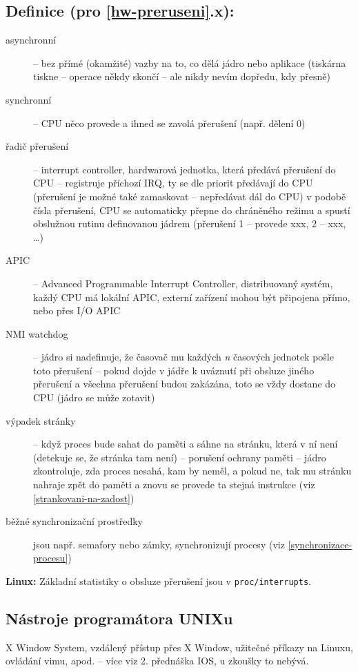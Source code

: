 \documentclass[a4paper, 11pt]{article}
\begin{document}
\subsection*{Definice (pro \ref{hw-preruseni}.x):}
\begin{description}
\item[asynchronní] -- bez přímé (okamžité) vazby na to, co dělá jádro nebo aplikace (tiskárna tiskne -- operace někdy skončí -- ale nikdy nevím dopředu, kdy přesně)

\item[synchronní] -- CPU něco provede a ihned se zavolá přerušení (např. dělení 0)

\item[řadič přerušení] -- interrupt controller, hardwarová jednotka, která předává přerušení do CPU -- registruje příchozí IRQ, ty se dle priorit předávají do CPU (přerušení je možné také zamaskovat -- nepředávat dál do CPU) v podobě čísla přerušení, CPU se automaticky přepne do chráněného režimu a spustí obslužnou rutinu definovanou jádrem (přerušení 1 -- provede xxx, 2 -- xxx, \ldots)

\item[APIC] -- Advanced Programmable Interrupt Controller, distribuovaný systém, každý CPU má lokální APIC, externí zařízení mohou být připojena přímo, nebo přes I/O APIC

\item[NMI watchdog] -- jádro si nadefinuje, že časovač mu každých \emph{n} časových jednotek pošle toto přerušení -- pokud dojde v jádře k uváznutí při obsluze jiného přerušení a všechna přerušení budou zakázána, toto se vždy dostane do CPU (jádro se může zotavit)

\item[výpadek stránky] -- když proces bude sahat do paměti a sáhne na stránku, která v ní není (detekuje se, že stránka tam není) -- porušení ochrany paměti -- jádro zkontroluje, zda proces nesahá, kam by neměl, a pokud ne, tak mu stránku nahraje zpět do paměti a znovu se provede ta stejná instrukce (viz \ref{strankovani-na-zadost})

\item[běžné synchronizační prostředky] jsou např. semafory nebo zámky, synchronizují procesy (viz \ref{synchronizace-procesu})
\end{description}

\textbf{Linux:}
Základní statistiky o obsluze přerušení jsou v \verb|proc/interrupts|.

\subsection{Nástroje programátora UNIXu}
X Window System, vzdálený přístup přes X Window, užitečné příkazy na Linuxu, ovládání vimu, apod. -- více viz 2. přednáška IOS, u zkoušky to nebývá.
\end{document}
